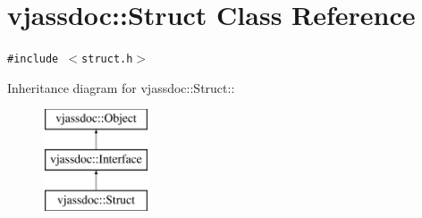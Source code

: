\hypertarget{classvjassdoc_1_1Struct}{
\section{vjassdoc::Struct Class Reference}
\label{classvjassdoc_1_1Struct}
}
{\tt \#include $<$struct.h$>$}

Inheritance diagram for vjassdoc::Struct::\begin{figure}[H]
\begin{center}
\leavevmode
\includegraphics[height=3cm]{classvjassdoc_1_1Struct}
\end{center}
\end{figure}
